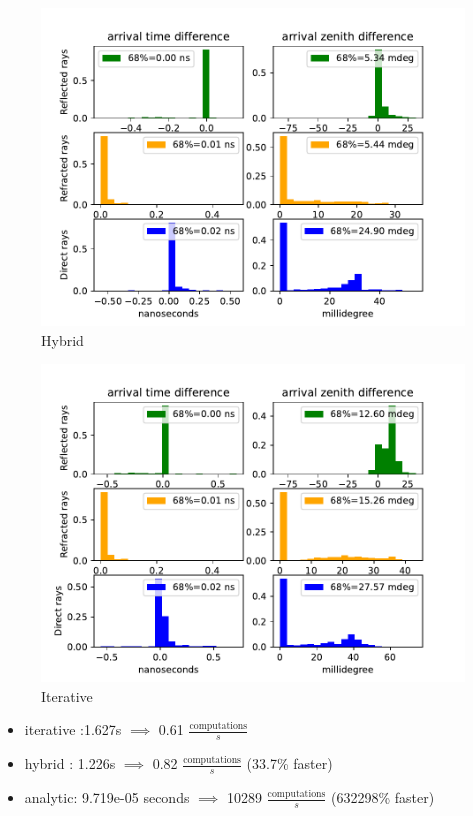 \documentclass{beamer}
\begin{document}
\begin{frame}
	\begin{minipage}{0.49\textwidth}
	\begin{figure}
		\centering
		\includegraphics[width=\textwidth]{figures/hybrid_comparison_N_500.pdf}
		\caption{Hybrid}
	\end{figure}
	\end{minipage}
	\begin{minipage}{0.49\textwidth}
	\begin{figure}
		\centering
		\includegraphics[width=\textwidth]{figures/iterative_comparison_N_500.pdf}
		\caption{Iterative}
	\end{figure}
	\end{minipage}
\end{frame}
\begin{frame}
	\begin{itemize}
    \item iterative :1.627s $\implies$ 0.61 $\frac{\text{computations}}{s}$
		\item hybrid : 1.226s $\implies$ 0.82 $\frac{\text{computations}}{s}$ (33.7\% faster) 
		\item analytic: 9.719e-05 seconds $\implies$ 10289 $\frac{\text{computations}}{s}$ (632298\% faster)
	\end{itemize}
\end{frame}
\end{document}
